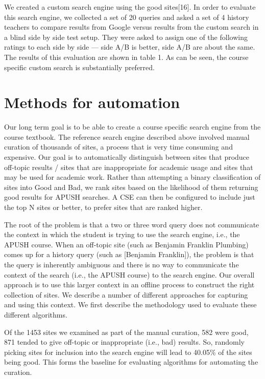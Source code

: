 \documentclass{acm_proc_article-sp}
\begin{document}
We created a custom search engine using the good sites[16]. In order to evaluate
this search engine, we collected a set of 20 queries and asked a set of 4
history teachers to compare results from Google versus results from the custom
search in a blind side by side test setup. They were asked to assign one of the
following ratings to each side by side --- side A/B is better, side A/B are
about the same. The results of this evaluation are shown in table 1. As can be
seen,  the course specific custom search is substantially preferred. 

\section{Methods for automation}

Our long term goal is to be able to create a course specific search engine from
the course textbook. The reference search engine described above involved manual
curation of thousands of sites, a process that is very time consuming and
expensive. Our goal is to automatically distinguish between sites that produce
off-topic results / sites that are inappropriate for academic usage and sites
that may be used for academic work.  Rather than attempting a binary
classification of sites into Good and Bad, we rank sites based on the likelihood
of them returning good results for APUSH searches. A CSE can then be configured
to include just the top N sites or better, to prefer sites that are ranked
higher. 

The root of the problem is that a two or three word query does not communicate
the context in which the student is trying to use the search engine, i.e., the
APUSH course.  When an off-topic site (such as Benjamin Franklin Plumbing) comes
up for a history query (such as [Benjamin Franklin]), the problem is that the
query is inherently ambiguous and there is no way to communicate the context of
the search (i.e., the APUSH course) to the search engine.  Our overall approach
is to use this larger context in an offline process to construct the right
collection of sites. We describe a number of different approaches for capturing
and using this context. We first describe the methodology used to evaluate these
different algorithms. 

Of the 1453 sites we examined as part of the manual curation, 582 were good, 871
tended to give off-topic or inappropriate (i.e., bad) results. So, randomly
picking sites for inclusion into the search engine will lead to 40.05\% of the
sites being good. This forms the baseline for evaluating algorithms for
automating the curation. 
\end{document}

